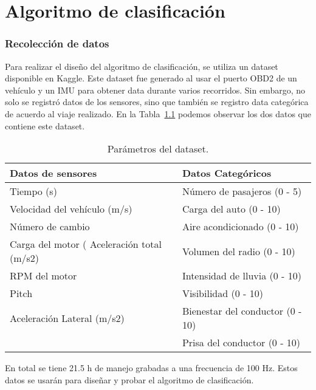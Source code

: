\chapter{Algoritmo de clasificación}
\label{chap:algoritmo}

 \graphicspath{{Chapter5/Figuras/}{Chapter6/Figs/PDF/}{Chapter4/Figs/}}

\subsection{Recolección de datos}
Para realizar el diseño del algoritmo de clasificación, se utiliza un dataset disponible en Kaggle. Este dataset fue generado al usar el puerto OBD2 de un vehículo y un IMU para obtener data durante varios recorridos. Sin embargo, no solo se registró datos de los sensores, sino que también se registro data categórica de acuerdo al viaje realizado. En la Tabla~\ref{diag:Dataset} podemos observar los dos datos que contiene este dataset.

\bgroup
\def\arraystretch{1.5}%
\begin{table}[bth!]
\centering
\caption[Parámetros del dataset]{Parámetros del dataset.}
\begin{tabular}{@{}ll@{}}
\toprule
Datos de sensores & Datos Categóricos \\ \midrule
Tiempo (s) & Número de pasajeros (0 - 5) \\
Velocidad del vehículo (m/s) & Carga del auto (0 - 10) \\
Número de cambio & Aire acondicionado (0 - 10) \\
Carga del motor (%
Aceleración total (m/s2) & Volumen del radio (0 - 10) \\
RPM del motor & Intensidad de lluvia (0 - 10) \\
Pitch & Visibilidad (0 - 10) \\
Aceleración Lateral (m/s2) & Bienestar del conductor (0 - 10) \\
 & Prisa del conductor (0 - 10) \\ \bottomrule
\end{tabular}
\label{diag:Dataset}
\end{table}
\egroup



En total se tiene 21.5 h de manejo grabadas a una frecuencia de 100 Hz. Estos datos se usarán para diseñar y probar el algoritmo de clasificación.





